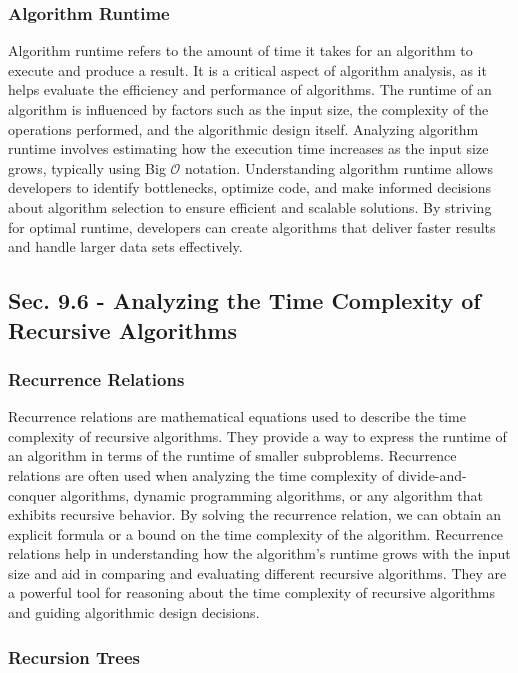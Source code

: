 \subsubsection{Algorithm Runtime}

Algorithm runtime refers to the amount of time it takes for an algorithm to execute and produce a result. It is a critical aspect of algorithm analysis, as it helps evaluate the efficiency and performance of algorithms. The runtime of an algorithm is influenced by factors such as the input size, the complexity of the operations performed, and the algorithmic design itself. Analyzing algorithm runtime involves estimating how the execution time increases as the input 
size grows, typically using Big $\mathcal{O}$ notation. Understanding algorithm runtime allows developers to identify bottlenecks, optimize code, and make informed decisions about algorithm selection to ensure efficient and scalable solutions. By striving for optimal runtime, developers can create algorithms that deliver faster results and handle larger data sets effectively.

\subsection*{Sec. 9.6 - Analyzing the Time Complexity of Recursive Algorithms}

\subsubsection{Recurrence Relations}

Recurrence relations are mathematical equations used to describe the time complexity of recursive algorithms. They provide a way to express the runtime of an algorithm in terms of the runtime of smaller subproblems. Recurrence relations are often used when analyzing the time complexity of divide-and-conquer algorithms, dynamic programming algorithms, or any algorithm that exhibits recursive behavior. By solving the recurrence relation, we can obtain an explicit formula 
or a bound on the time complexity of the algorithm. Recurrence relations help in understanding how the algorithm's runtime grows with the input size and aid in comparing and evaluating different recursive algorithms. They are a powerful tool for reasoning about the time complexity of recursive algorithms and guiding algorithmic design decisions.

\subsubsection{Recursion Trees}

